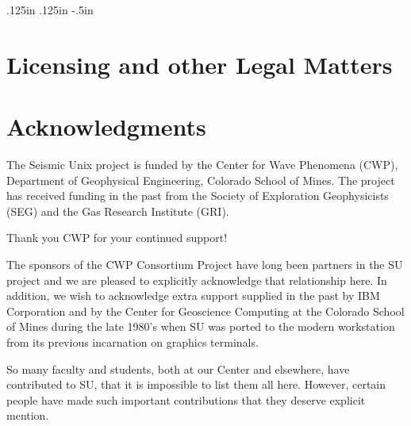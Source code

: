 
\textwidth 6.25in
\textheight 8.75in
\oddsidemargin .125in
\evensidemargin .125in
\topmargin -.5in

\def\releasenumber{40}
\def\currentyear{2007}
\def\ftpsite{ftp.cwp.mines.edu}
\def\website{www.cwp.mines.edu/cwpcodes}
\def\ipaddress{138.67.12.4}
\newtheorem{question}{Question}
\newtheorem{answer}{Answer}
\newenvironment{rmans}{\begin{answer} \em}{\end{answer}}





\tableofcontents
\newpage
\chapter*{Licensing and other Legal Matters}


\chapter*{Acknowledgments}

The Seismic Unix project is funded by the Center for Wave Phenomena (CWP), 
Department of Geophysical Engineering, Colorado School of Mines.  
The project has received funding in the past  from the Society of 
Exploration Geophysicists (SEG) and the Gas Research Institute (GRI).

Thank you  CWP for your continued support!

The sponsors of the CWP Consortium Project have long been partners
in the  SU project and we are pleased to explicitly acknowledge that
relationship here.  In addition, we wish to acknowledge extra support
supplied in the past by IBM Corporation and by the Center for
Geoscience Computing at the Colorado School of Mines during the
late 1980's when SU was ported to the modern workstation from its
previous incarnation on graphics terminals.

So many faculty and students, both at our Center and elsewhere, have
contributed to SU, that it is impossible to list them all here.
However, certain people have made such important contributions that they
deserve explicit mention.

